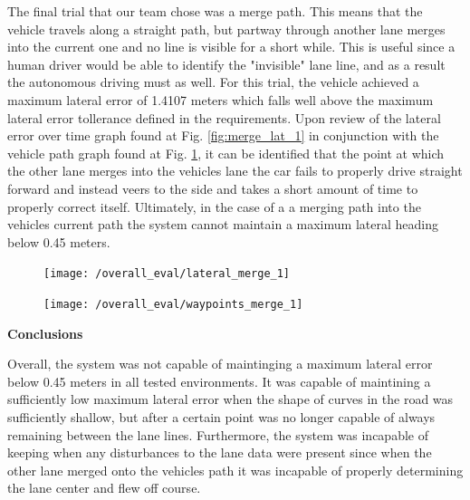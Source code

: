 \documentclass[titlepage,draft]{article}
\begin{document}
{The final trial that our team chose was a merge path. This means that the vehicle travels along a straight path, but partway through another lane merges into the current one and no line is visible for a short while. This is useful since a human driver would be able to identify the "invisible" lane line, and as a result the autonomous driving must as well. For this trial, the vehicle achieved a maximum lateral error of 1.4107 meters which falls well above the maximum lateral error tollerance defined in the requirements. Upon review of the lateral error over time graph found at Fig. \ref{fig:merge_lat_1} in conjunction with the vehicle path graph found at Fig. \ref{fig:merge_way_1}, it can be identified that the point at which the other lane merges into the vehicles lane the car fails to properly drive straight forward and instead veers to the side and takes a short amount of time to properly correct itself. Ultimately, in the case of a a merging path into the vehicles current path the system cannot maintain a maximum lateral heading below 0.45 meters.

\begin{figure}
	\centering
	\begin{minipage}{.45\textwidth}
		\centering
		\texttt{[image: /overall\_eval/lateral\_merge\_1]}
		\label{fig:merge_lat_1}
	\end{minipage}%
	\hspace{0.1\textwidth}%
	\begin{minipage}{.45\textwidth}
		\centering
		\texttt{[image: /overall\_eval/waypoints\_merge\_1]}
		\label{fig:merge_way_1}
	\end{minipage}
\end{figure}

\textbf{Conclusions}

Overall, the system was not capable of maintinging a maximum lateral error below 0.45 meters in all tested environments. It was capable of maintining a sufficiently low maximum lateral error when the shape of curves in the road was sufficiently shallow, but after a certain point was no longer capable of always remaining between the lane lines. Furthermore, the system was incapable of keeping when any disturbances to the lane data were present since when the other lane merged onto the vehicles path it was incapable of properly determining the lane center and flew off course.

}
\end{document}
